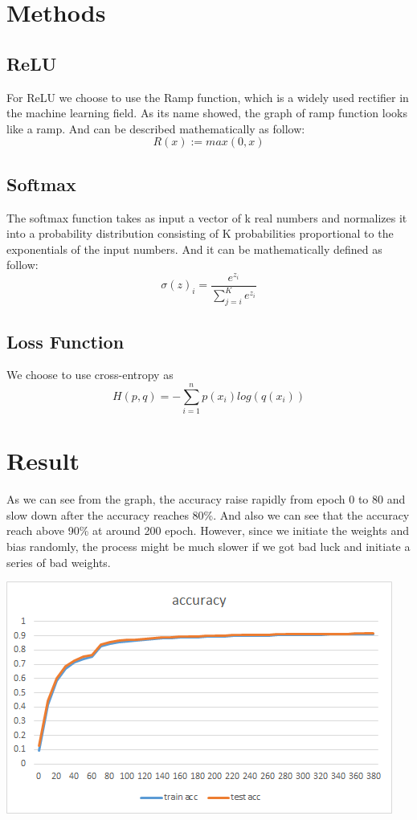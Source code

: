 \documentclass[12pt]{article}
\begin{document}
\section{Methods}
\subsection*{ReLU}
For ReLU we choose to use the Ramp function, which is a widely used rectifier in the machine 
learning field. As its name showed, the graph of ramp function looks like a ramp. And can be 
described mathematically as follow:
\begin{equation*}
    R(x):=max(0,x)
\end{equation*}

\subsection*{Softmax}
The softmax function takes as input a vector of k real numbers and normalizes it into a probability distribution consisting of K probabilities proportional to the exponentials of the input numbers.
And it can be mathematically defined as follow:
\begin{equation*}
    \sigma(z)_i = \frac{e^{z_i}}{\sum_{j=i}^K e^{z_i}}
\end{equation*}

\subsection*{Loss Function}
We choose to use cross-entropy as 
\begin{equation*}
    H(p,q) = -\sum_{i=1}^n p(x_i)log(q(x_i))
\end{equation*}

\section{Result}
As we can see from the graph, the accuracy raise rapidly from epoch 0 to 80 and slow down after 
the accuracy reaches 80\%. And also we can see that the accuracy reach above 90\% at around 200
 epoch. However, since we initiate the weights and bias randomly, the process might be much 
 slower if we got bad luck and initiate a series of bad weights.
 \begin{center}
     \includegraphics[scale=1]{accuracy.png}
 \end{center}
\end{document}
